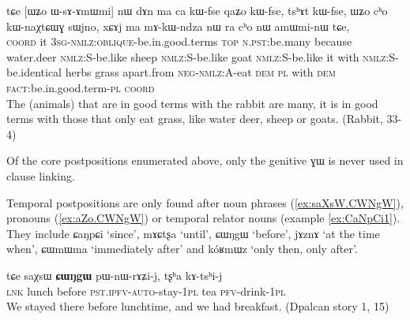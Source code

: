 \documentclass[oldfontcommands,oneside,a4paper,11pt]{article}
\newcommand{\ipa}[1]{{\phon \mbox{#1}}} %
\begin{document}
\begin{exe}
   \ex \label{ex:WsAmWmi}
 \gll 
\ipa{tɕe}   	[\ipa{ɯʑo}   	\ipa{ɯ-sɤ-ɤmɯmi}]   	\ipa{nɯ}   	\ipa{dɤn}   	\ipa{ma}   	\ipa{ca}   	\ipa{kɯ-fse}   	\ipa{qaʑo}   	\ipa{kɯ-fse,}   	\ipa{tsʰɤt}   	\ipa{kɯ-fse,}   	 \ipa{ɯʑo}   	\ipa{cʰo}   	\ipa{kɯ-naχtɕɯɣ}   	\ipa{sɯjno,}   	\ipa{xɕɤj}   	\ipa{ma}   	\ipa{mɤ-kɯ-ndza}   	\ipa{nɯ} \ipa{ra}   	\ipa{cʰo}   	\ipa{nɯ}   	\ipa{amɯmi-nɯ}   	\ipa{tɕe,}   \\
\textsc{coord} it \textsc{3sg-nmlz:oblique}-be.in.good.terms \textsc{top} \textsc{n.pst:}be.many because water.deer \textsc{nmlz:S}-be.like sheep \textsc{nmlz:S}-be.like goat  \textsc{nmlz:S}-be.like it with  \textsc{nmlz:S}-be.identical herbs grass apart.from \textsc{neg-nmlz:A}-eat \textsc{dem} \textsc{pl} with \textsc{dem} \textsc{fact}:be.in.good.term-\textsc{pl} \textsc{coord} \\
\glt The (animals) that are in good terms with the rabbit are many, it is in good terms with those that only eat grass, like water deer, sheep or goats. (Rabbit, 33-4)
\end{exe}

Of the core postpositions enumerated above, only the genitive \ipa{ɣɯ} is never used in clause linking.

Temporal postpositions   are only found after noun phrases (\ref{ex:saXsW.CWNgW}), pronouns (\ref{ex:aZo.CWNgW}) or temporal relator nouns (example \ref{ex:CaNpCi1}). They include  \ipa{ɕaŋpɕi} `since', \ipa{mɤɕtʂa} `until', \ipa{ɕɯŋgɯ} `before', \ipa{jɤznɤ} `at the time when',  \ipa{ɕɯmɯma} `immediately after' and \ipa{kóʁmɯz}   `only then, only after'.

\begin{exe}
   \ex \label{ex:saXsW.CWNgW}
 \gll 
\ipa{tɕe}  	\ipa{saχsɯ}  	\ipa{\textbf{ɕɯŋgɯ}}  	\ipa{pɯ-nɯ-rɤʑi-j,}  	\ipa{tʂʰa}  	\ipa{kɤ-tsʰi-j}  \\
\textsc{lnk} lunch before \textsc{pst.ipfv-auto}-stay-\textsc{1pl} tea \textsc{pfv}-drink-\textsc{1pl} \\
\glt  We stayed there before lunchtime, and we had breakfast. 
(Dpalcan story 1, 15)
\end{exe}
\end{document}
